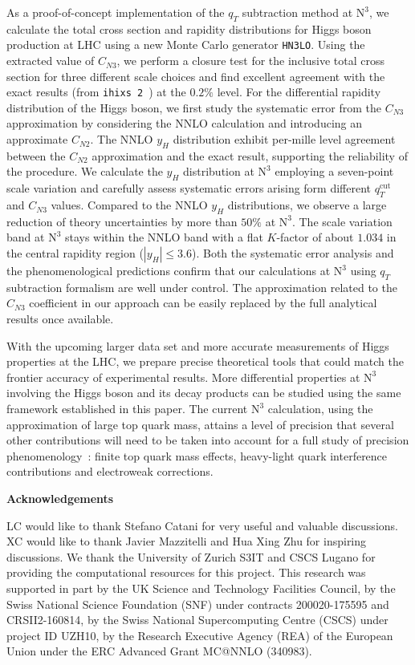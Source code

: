 \documentclass[12pt]{article}
\DeclareRobustCommand{\qt}{\ensuremath{q_T}\xspace}
\DeclareRobustCommand{\qtcut}{\ensuremath{q_T^\mathrm{cut}}\xspace}
\DeclareRobustCommand{\LO}{\text{LO}\xspace}
\DeclareRobustCommand{\N}[1]{\ensuremath{\text{N}^{#1}}} %
\begin{document}
As a proof-of-concept implementation of the $\qt$ subtraction method at \N3\LO,  we calculate the total cross section and rapidity distributions for Higgs boson production at LHC using a new Monte Carlo generator \texttt{HN3LO}. Using the extracted value of $C_{N3}$, we perform a closure test for the inclusive total cross section for three different scale choices and find excellent agreement with the exact results (from \texttt{ihixs 2}~\cite{Dulat:2018rbf}) at the $0.2\%$ level. For the differential rapidity distribution of the Higgs boson, we first study the systematic error from the $C_{N3}$ approximation by considering the NNLO calculation and introducing an approximate $C_{N2}$. The NNLO $y_H$ distribution exhibit per-mille level agreement between the $C_{N2}$ approximation and the exact result, supporting the reliability of the procedure. 
We calculate the $y_H$ distribution at \N3\LO employing a seven-point scale variation and carefully assess systematic errors arising form different $\qtcut$ and $C_{N3}$ values. Compared to the NNLO $y_H$ distributions, we observe a large reduction of theory uncertainties by more than $50\%$ at \N3\LO. The scale variation band at \N3\LO stays within the NNLO band with a flat $K$-factor of about $1.034$ in the central rapidity region ($|y_H|\leq3.6$). Both the systematic error analysis and the phenomenological predictions confirm that our calculations at \N3\LO using $\qt$ subtraction formalism are well under control. The approximation related to the $C_{N3}$ coefficient in our approach can be easily replaced by the full analytical results once available. 

With the upcoming larger data set and more accurate measurements of Higgs properties at the LHC, we prepare precise theoretical tools that could match the frontier accuracy of experimental results. More differential properties at \N3\LO involving the Higgs boson and its decay products can be studied using the same framework established in this paper. The current \N3\LO calculation, using the approximation of large top quark mass, attains a level of  precision that several 
other contributions will need to be taken into account for a full study of precision phenomenology~\cite{Anastasiou:2016cez}: finite top quark mass effects, heavy-light quark interference contributions  
and electroweak corrections. 


\bigskip\noindent\textbf{Acknowledgements}

LC would like to thank Stefano Catani for very useful and valuable discussions. XC would like to thank Javier Mazzitelli and Hua Xing Zhu for inspiring discussions. We thank the University of Zurich S3IT and CSCS Lugano for providing the computational resources for this project. This research was supported in part by the UK Science and Technology Facilities Council, by the Swiss National Science Foundation (SNF) under contracts 200020-175595 and CRSII2-160814, by the Swiss National Supercomputing Centre (CSCS) under project ID UZH10, by the Research Executive Agency (REA) of the European Union under the ERC Advanced Grant MC@NNLO (340983).
\end{document}
